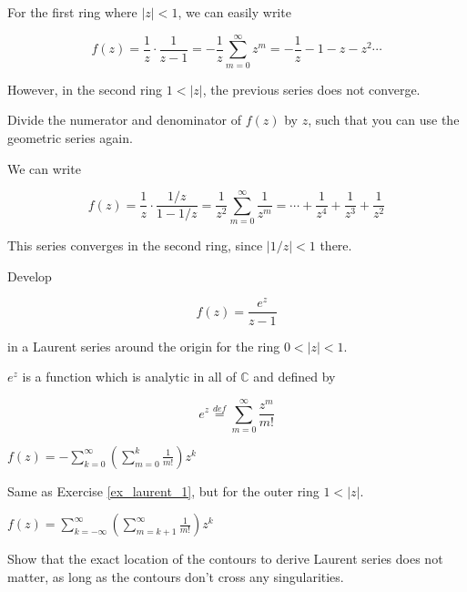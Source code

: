 For the first ring where $| z | < 1$, we can easily write

$$f(z)=\frac{1}{z} \cdot \frac{1}{z-1} = -\frac{1}{z} \sum_{m=0}^{\infty} z^m =-\frac{1}{z}-1-z-z^2 \cdots$$

However, in the second ring  $ 1 < |z|$, the previous series does not converge.

\begin{cue}
Divide the numerator and denominator of $f(z)$ by $z$, such that you can use the geometric series again.
\end{cue}

We can write

$$f(z)=\frac{1}{z} \cdot \frac{1 / z }{1-1/z} = \frac{1}{z^2} \sum_{m=0}^{\infty} \frac{1}{z^m} =\cdots+\frac{1}{z^4}+\frac{1}{z^3} + \frac{1}{z^2}$$

This series converges in the second ring, since $|1/z| < 1$ there.

\begin{exer}
\label{ex_laurent_1}
Develop

$$f(z)=\frac{e^z}{z-1}$$

in a Laurent series around the origin for the ring $0 < | z | < 1$.

$e^z$ is a function which is analytic in all of $\mathbb{C}$ and defined by

$$e^z \stackrel{def}{=} \sum_{m=0}^{\infty} \frac{z^m}{m!} $$

\begin{sol}
 $f(z)= - \sum_{k=0}^{\infty} \left(\sum _{m=0}^k \frac{1}{m!} \right) z^k $
\end{sol}

\end{exer}

\begin{exer}
  Same as Exercise \ref{ex_laurent_1}, but for the outer ring  $1 < | z |$.

\begin{sol}
 $f(z)=  \sum_{k=-\infty}^{\infty} \left(\sum_{m=k+1}^\infty \frac{1}{m!} \right) z^k $
\end{sol}
  
\end{exer}

\begin{exer}
  Show that the exact location of the contours to derive Laurent series does not matter, as long as the contours don't cross any singularities.

\end{exer}

